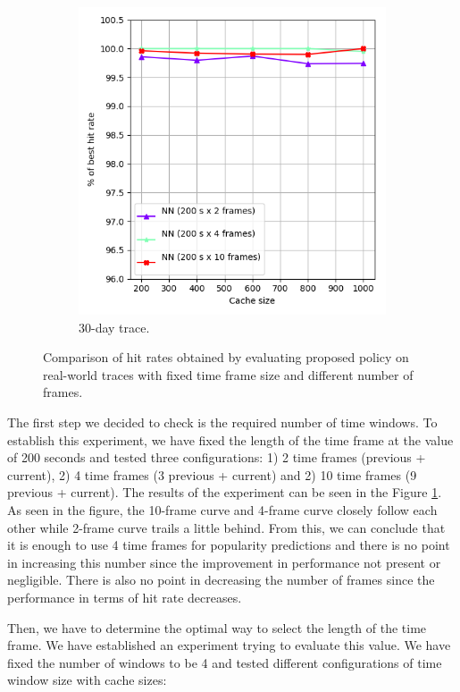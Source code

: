 \begin{figure}[t!]
\begin{subfigure}[b]{0.49\linewidth}
		\includegraphics[width=\linewidth]{pics/cache5_2.png}
		\caption{30-day trace.}
	\end{subfigure}
	\caption{Comparison of hit rates obtained by evaluating proposed policy on real-world traces with fixed time frame size and different number of frames.}
	\label{fig:cache5}
\end{figure}

The first step we decided to check is the required number of time windows. To establish this experiment, we have fixed the length of the time frame at the value of 200 seconds and tested three configurations: 1) 2 time frames (previous + current), 2) 4 time frames (3 previous + current) and 2) 10 time frames (9 previous + current). The results of the experiment can be seen in the Figure \ref{fig:cache5}. As seen in the figure, the 10-frame curve and 4-frame curve closely follow each other while 2-frame curve trails a little behind. From this, we can conclude that it is enough to use 4 time frames for popularity predictions and there is no point in increasing this number since the improvement in performance not present or negligible. There is also no point in decreasing the number of frames since the performance in terms of hit rate decreases.

Then, we have to determine the optimal way to select the length of the time frame. We have established an experiment trying to evaluate this value. We have fixed the number of windows to be 4 and tested different configurations of time window size with cache sizes:

